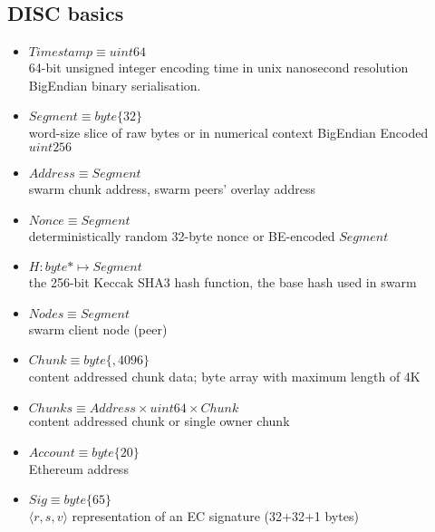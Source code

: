 \subsection{DISC basics \statusgreen}

\begin{itemize}[itemsep=2pt,leftmargin=0pt]
\item[] $\mathit{Timestamp}\equiv\mathit{uint64}$\\\hspace*{1em}
    64-bit unsigned integer encoding time in unix nanosecond resolution BigEndian binary serialisation.
\item[] $\mathit{Segment}\equiv\mathit{byte}\{32\}$\\\hspace*{1em}
    word-size slice of raw bytes or in numerical context BigEndian Encoded  $\mathit{uint256}$
\item[]  $\mathit{Address} \equiv \mathit{Segment}$\\\hspace*{1em}
    swarm chunk address, swarm peers' overlay address
\item[] $\mathit{Nonce} \equiv \mathit{Segment}$\\\hspace*{1em}
    deterministically random 32-byte nonce or BE-encoded $\mathit{Segment}$
\item[] $\mathit{H}:\mathit{byte}{*}\mapsto\mathit{Segment}$\\\hspace*{1em}
the 256-bit Keccak SHA3 hash function, the base hash used in swarm
\item[] $\mathit{Nodes} \equiv \mathit{Segment}$\\\hspace*{1em}
    swarm client node (peer)
\item[] $\mathit{Chunk}\equiv\mathit{byte}\{,4096\}$\\\hspace*{1em}
content addressed chunk data; byte array with maximum length of 4K
\item[] $\mathit{Chunks}\equiv \mathit{Address}\times\mathit{uint64}\times\mathit{Chunk}$\\\hspace*{1em}
content addressed chunk or single owner chunk
\item[]$\mathit{Account}\equiv \mathit{byte}\{20\}$\\\hspace*{1em}
    Ethereum address
\item[]$\mathit{Sig} \equiv \mathit{byte}\{65\}$\\\hspace*{1em}
$\langle r,s,v\rangle$ representation of an EC signature (32+32+1
bytes)
\end{itemize}


